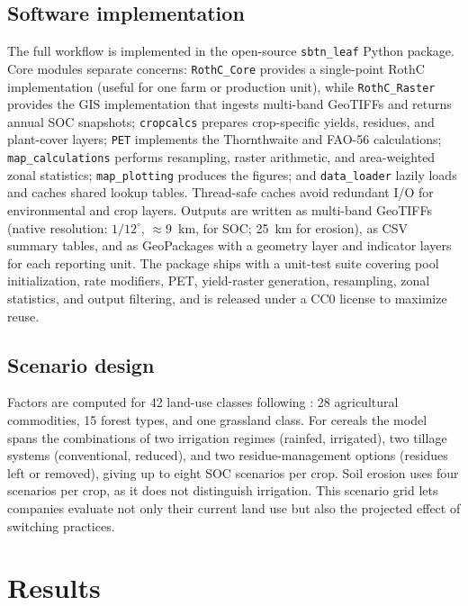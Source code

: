 \documentclass[11pt]{article}
\begin{document}
\subsection{Software implementation}
\label{sec:software}
The full workflow is implemented in the open-source \texttt{sbtn\_leaf} Python package.
Core modules separate concerns: \texttt{RothC\_Core} provides a single-point RothC
implementation (useful for one farm or production unit), while \texttt{RothC\_Raster}
provides the GIS implementation that ingests multi-band GeoTIFFs and returns annual SOC
snapshots; \texttt{cropcalcs} prepares crop-specific yields, residues, and plant-cover
layers; \texttt{PET} implements the Thornthwaite and FAO-56 calculations;
\texttt{map\_calculations} performs resampling, raster arithmetic, and area-weighted
zonal statistics; \texttt{map\_plotting} produces the figures; and \texttt{data\_loader}
lazily loads and caches shared lookup tables. Thread-safe caches avoid redundant I/O for
environmental and crop layers. Outputs are written as multi-band GeoTIFFs (native
resolution: $1/12^{\circ}$, $\approx$9~km, for SOC; 25~km for erosion), as CSV summary
tables, and as GeoPackages with a geometry layer and indicator layers for each reporting
unit. The package ships with a unit-test suite covering pool initialization, rate
modifiers, PET, yield-raster generation, resampling, zonal statistics, and output
filtering, and is released under a CC0 license to maximize reuse.

\subsection{Scenario design}
\label{sec:scenarios}
Factors are computed for 42 land-use classes following \citet{morais2019}: 28
agricultural commodities, 15 forest types, and one grassland class. For cereals the model
spans the combinations of two irrigation regimes (rainfed, irrigated), two tillage
systems (conventional, reduced), and two residue-management options (residues left or
removed), giving up to eight SOC scenarios per crop. Soil erosion uses four scenarios
per crop, as it does not distinguish irrigation. This scenario grid lets companies
evaluate not only their current land use but also the projected effect of switching
practices.

\section{Results}
\label{sec:results}
\end{document}
